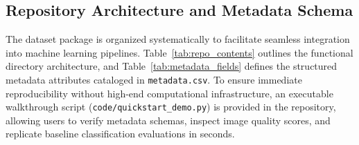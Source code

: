 \documentclass[a4paper,fleqn,12pt]{cas-sc}
\begin{document}
\subsection{Repository Architecture and Metadata Schema}

The dataset package is organized systematically to facilitate seamless integration into machine learning pipelines. Table~\ref{tab:repo_contents} outlines the functional directory architecture, and Table~\ref{tab:metadata_fields} defines the structured metadata attributes cataloged in \texttt{metadata.csv}. To ensure immediate reproducibility without high-end computational infrastructure, an executable walkthrough script (\texttt{code/quickstart\_demo.py}) is provided in the repository, allowing users to verify metadata schemas, inspect image quality scores, and replicate baseline classification evaluations in seconds.
\end{document}
